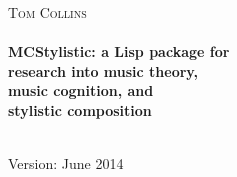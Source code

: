 \begin{titlepage}

\begin{flushleft}
\textsc{\huge Tom Collins}\\[2.35cm]


\HRule \\[0.1cm]
{ \huge \bfseries MCStylistic: a Lisp package for\\[.2cm] research into music theory,\\[.2cm] music cognition, and\\[.45cm] stylistic composition}\\[.14cm]
\HRule \\[4.15cm]
\end{flushleft}

\begin{center}


\vfill

\textsf{\Large Version: June 2014}


\end{center}

\end{titlepage}